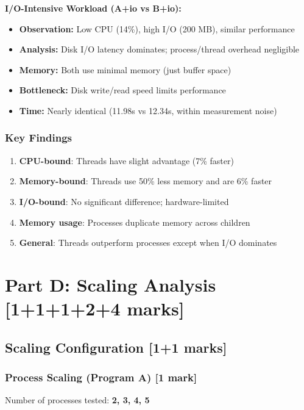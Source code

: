 \documentclass[12pt,a4paper]{article}
\begin{document}
\textbf{I/O-Intensive Workload (A+io vs B+io):}
\begin{itemize}
    \item \textbf{Observation:} Low CPU (14\%), high I/O (200 MB), similar performance
    \item \textbf{Analysis:} Disk I/O latency dominates; process/thread overhead negligible
    \item \textbf{Memory:} Both use minimal memory (just buffer space)
    \item \textbf{Bottleneck:} Disk write/read speed limits performance
    \item \textbf{Time:} Nearly identical (11.98s vs 12.34s, within measurement noise)
\end{itemize}

\subsubsection{Key Findings}
\begin{enumerate}
    \item \textbf{CPU-bound}: Threads have slight advantage (7\% faster)
    \item \textbf{Memory-bound}: Threads use 50\% less memory and are 6\% faster
    \item \textbf{I/O-bound}: No significant difference; hardware-limited
    \item \textbf{Memory usage}: Processes duplicate memory across children
    \item \textbf{General}: Threads outperform processes except when I/O dominates
\end{enumerate}

\section{Part D: Scaling Analysis [1+1+1+2+4 marks]}

\subsection{Scaling Configuration [1+1 marks]}

\subsubsection{Process Scaling (Program A) [1 mark]}
Number of processes tested: \textbf{2, 3, 4, 5}
\end{document}
